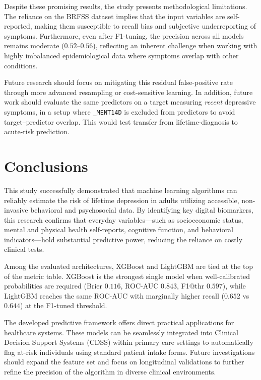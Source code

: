 \documentclass[conference]{IEEEtran}
\begin{document}
Despite these promising results, the study presents methodological limitations. The reliance on the BRFSS dataset implies that the input variables are self-reported, making them susceptible to recall bias and subjective underreporting of symptoms. Furthermore, even after F1-tuning, the precision across all models remains moderate ($0.52$–$0.56$), reflecting an inherent challenge when working with highly imbalanced epidemiological data where symptoms overlap with other conditions.

Future research should focus on mitigating this residual false-positive rate through more advanced resampling or cost-sensitive learning. In addition, future work should evaluate the same predictors on a target measuring \textit{recent} depressive symptoms, in a setup where \texttt{\_MENT14D} is excluded from predictors to avoid target–predictor overlap. This would test transfer from lifetime-diagnosis to acute-risk prediction.

\section{Conclusions}

This study successfully demonstrated that machine learning algorithms can reliably estimate the risk of lifetime depression in adults utilizing accessible, non-invasive behavioral and psychosocial data. By identifying key digital biomarkers, this research confirms that everyday variables—such as socioeconomic status, mental and physical health self-reports, cognitive function, and behavioral indicators—hold substantial predictive power, reducing the reliance on costly clinical tests.

Among the evaluated architectures, XGBoost and LightGBM are tied at the top of the metric table. XGBoost is the strongest single model when well-calibrated probabilities are required (Brier $0.116$, ROC-AUC $0.843$, F1@thr $0.597$), while LightGBM reaches the same ROC-AUC with marginally higher recall ($0.652$ vs $0.644$) at the F1-tuned threshold.

The developed predictive framework offers direct practical applications for healthcare systems. These models can be seamlessly integrated into Clinical Decision Support Systems (CDSS) within primary care settings to automatically flag at-risk individuals using standard patient intake forms. Future investigations should expand the feature set and focus on longitudinal validations to further refine the precision of the algorithm in diverse clinical environments.
\end{document}
